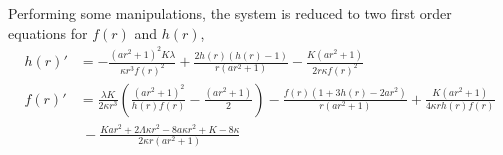 Performing some manipulations, the system is reduced to two first order equations for $f(r)$ and $h(r)$,
\begin{align}
h(r)'&=-\frac{(ar^2+1)^2K\lambda}{\kappa r^3f(r)^2}+\frac{2h(r)(h(r)-1)}{r(ar^2+1)}-\frac{K(ar^2+1)}{2r\kappa f(r)^2}\\
f(r)'&=\frac{\lambda K}{2\kappa r^3}\left(\frac{(ar^2+1)^2}{h(r) f(r)} -\frac{(ar^2+1)}{2}\right)-\frac{f(r)(1+3h(r)-2ar^2)}{r(ar^2+1)}+\frac{K(ar^2+1)}{4\kappa rh(r)f(r)}\\
&~-\frac{Kar^2+2\Lambda\kappa r^2-8a\kappa r^2+K-8\kappa}{2\kappa	 r(ar^2+1)}
\end{align}











































